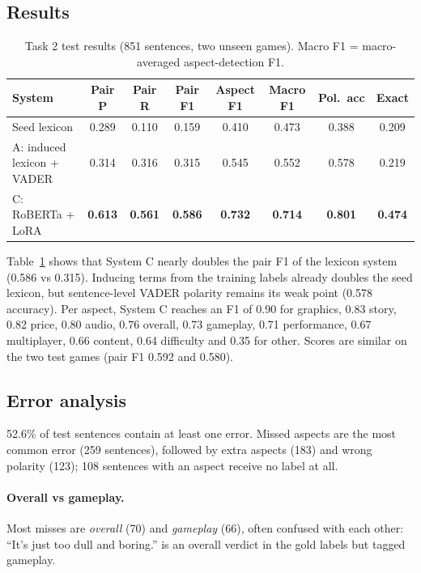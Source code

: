 \documentclass[11pt,a4paper]{article}
\begin{document}
\subsection{Results}

\begin{table}[t]
  \centering
  \small
  \begin{tabular}{lccccccc}
    \toprule
    System & Pair P & Pair R & Pair F1 & Aspect F1 & Macro F1 & Pol.\ acc & Exact \\
    \midrule
    Seed lexicon & 0.289 & 0.110 & 0.159 & 0.410 & 0.473 & 0.388 & 0.209 \\
    A: induced lexicon + VADER & 0.314 & 0.316 & 0.315 & 0.545 & 0.552 & 0.578 & 0.219 \\
    C: RoBERTa + LoRA & \textbf{0.613} & \textbf{0.561} & \textbf{0.586} & \textbf{0.732} &
      \textbf{0.714} & \textbf{0.801} & \textbf{0.474} \\
    \bottomrule
  \end{tabular}
  \caption{Task 2 test results (851 sentences, two unseen games). Macro F1 = macro-averaged
  aspect-detection F1.}
  \label{tab:t2results}
\end{table}

Table~\ref{tab:t2results} shows that System C nearly doubles the pair F1 of the lexicon system
(0.586 vs 0.315). Inducing terms from the training labels already doubles the seed lexicon,
but sentence-level VADER polarity remains its weak point (0.578 accuracy). Per aspect, System C
reaches an F1 of 0.90 for graphics, 0.83 story, 0.82 price, 0.80 audio, 0.76 overall,
0.73 gameplay, 0.71 performance, 0.67 multiplayer, 0.66 content, 0.64 difficulty and 0.35 for
other. Scores are similar on the two test games (pair F1 0.592 and 0.580).

\subsection{Error analysis}

52.6\% of test sentences contain at least one error. Missed aspects are the most common error
(259 sentences), followed by extra aspects (183) and wrong polarity (123); 108 sentences with
an aspect receive no label at all.

\paragraph{Overall vs gameplay.} Most misses are \emph{overall} (70) and \emph{gameplay} (66),
often confused with each other: ``It's just too dull and boring.'' is an overall verdict in
the gold labels but tagged gameplay.
\end{document}
